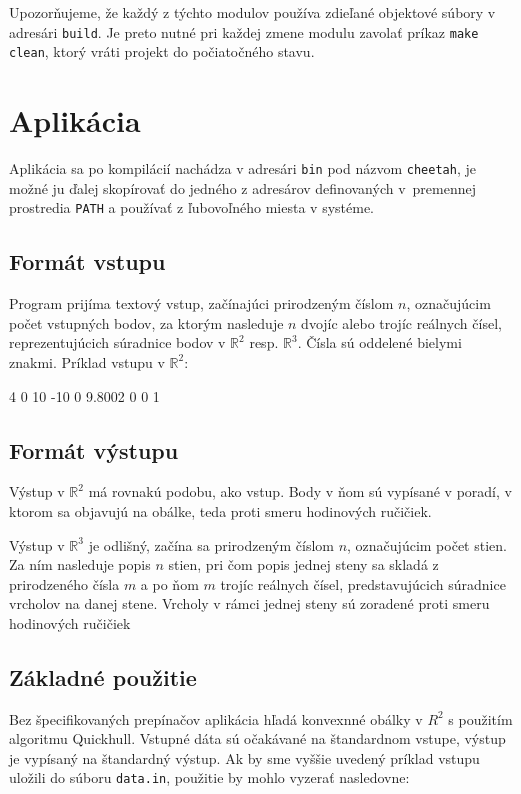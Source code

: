 \documentclass[a4paper, 12pt, slovak]{article}
\begin{document}
Upozorňujeme, že každý z týchto modulov používa zdieľané objektové súbory v adresári 
\texttt{build}. Je preto nutné pri každej zmene modulu zavolať príkaz \texttt{make 
clean}, ktorý vráti projekt do počiatočného stavu.

\section{Aplikácia}
Aplikácia sa po kompilácií nachádza v adresári \texttt{bin} pod názvom 
\texttt{cheetah}, je možné ju ďalej skopírovať do jedného z adresárov definovaných
v~premennej prostredia \texttt{PATH} a používať z ľubo\-voľ\-ného miesta v systéme.

\subsection{Formát vstupu}
Program prijíma textový vstup, začínajúci prirodzeným číslom $n$, označujúcim počet 
vstupných bodov, za ktorým nasleduje $n$ dvojíc alebo trojíc reálnych čísel, 
reprezentujúcich súradnice bodov v $\mathbb{R}^2$ resp. $\mathbb{R}^3$. Čísla 
sú oddelené bielymi znakmi. Príklad vstupu v $\mathbb{R}^2$:

\begin{c++}
4
0 10
-10 0
9.8002 0
0 1
\end{c++}

\subsection{Formát výstupu}
Výstup v $\mathbb{R}^2$ má rovnakú podobu, ako vstup. Body v ňom sú vypísané v 
poradí, v ktorom sa objavujú na obálke, teda proti smeru hodinových ručičiek. 

Výstup v $\mathbb{R}^3$ je odlišný, začína sa prirodzeným číslom $n$, označujúcim 
počet stien. Za ním nasleduje popis $n$ stien, pri čom popis jednej steny sa skladá 
z prirodzeného čísla $m$ a po ňom $m$ trojíc reálnych čísel, predstavujúcich 
súradnice vrcholov na danej stene. Vrcholy v rámci jednej steny sú zoradené proti 
smeru hodinových ručičiek

\subsection{Základné použitie}
Bez špecifikovaných prepínačov aplikácia hľadá konvexnné obálky v $R^2$ s použitím 
algoritmu Quickhull. Vstupné dáta sú očakávané na štandardnom vstupe, výstup je 
vypísaný na štandardný výstup. Ak by sme vyššie uvedený príklad vstupu uložili do 
súboru \texttt{data.in}, použitie by mohlo vyzerať nasledovne:
\end{document}
